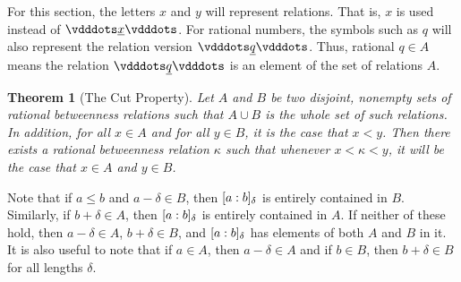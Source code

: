 \documentclass[12pt]{article}
\newtheorem{theorem}{Theorem}[section]
\begin{document}
For this section, the letters $x$ and $y$ will represent relations. That is, $x$ is used instead of $\xrel$. For rational numbers, the symbols such as $q$ will also represent the relation version $\xrel[q]$. Thus, rational $q \in A$ means the relation $\xrel[q]$ is an element of the set of relations $A$. 

\begin{theorem}[The Cut Property] 
Let $A$ and $B$ be two disjoint, nonempty sets of rational betweenness relations such that $A \cup B$ is the whole set of such relations. In addition, for all $x \in A$ and for all $y \in B$, it is the case that $x < y$. Then there exists a rational betweenness relation $\kappa$ such that whenever $x < \kappa < y$, it will be the case that $ x \in A$ and $y \in B$.
\end{theorem}

Note that if $a \leq b$ and $a-\delta \in B$, then $[a:b]_{\delta}$ is entirely contained in $B$. Similarly, if $b + \delta \in A$, then $[a:b]_{\delta}$ is entirely contained in $A$. If neither of these hold, then $a-\delta \in A$, $b+\delta \in B$, and $[a:b]_{\delta}$ has elements of both $A$ and $B$ in it. It is also useful to note that if $a \in A$, then $a-\delta \in A$ and if $b \in B$, then $b+\delta \in B$ for all lengths $\delta$.
\end{document}
